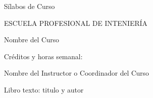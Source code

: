\documentclass[12pt]{article}
\begin{document}
Sílabos de Curso

ESCUELA PROFESIONAL DE INTENIERÍA

Nombre del Curso

Créditos y horas semanal:

Nombre del Instructor o Coordinador del Curso

Libro texto: titulo y autor
\end{document}
